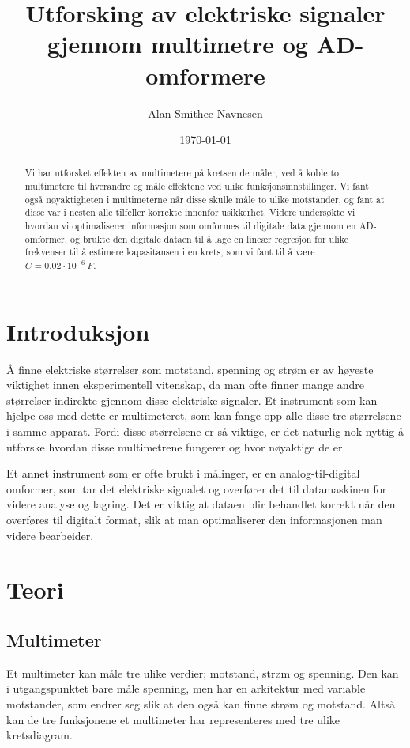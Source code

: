 \documentclass[norsk,a4paper,12pt]{article}
\title{Utforsking av elektriske signaler gjennom multimetre og AD-omformere}
\author{Alan Smithee Navnesen}
\date{\today}
\begin{document}
\maketitle

\begin{abstract}

Vi har utforsket effekten av multimetere på kretsen de måler, ved å koble to multimetere til hverandre og måle effektene ved ulike funksjonsinnstillinger. Vi fant også nøyaktigheten i multimeterne når disse skulle måle to ulike motstander, og fant at disse var i nesten alle tilfeller korrekte innenfor usikkerhet. Videre undersøkte vi hvordan vi optimaliserer informasjon som omformes til digitale data gjennom en AD-omformer, og brukte den digitale dataen til å lage en lineær regresjon for ulike frekvenser til å estimere kapasitansen i en krets, som vi fant til å være $C = 0.02 \cdot 10^{-6} \ F$.

\end{abstract}

\section{Introduksjon}
Å finne elektriske størrelser som motstand, spenning og strøm er av høyeste viktighet innen eksperimentell vitenskap, da man ofte finner mange andre størrelser indirekte gjennom disse elektriske signaler. Et instrument som kan hjelpe oss med dette er multimeteret, som kan fange opp alle disse tre størrelsene i samme apparat. Fordi disse størrelsene er så viktige, er det naturlig nok nyttig å utforske hvordan disse multimetrene fungerer og hvor nøyaktige de er. 

Et annet instrument som er ofte brukt i målinger, er en analog-til-digital omformer, som tar det elektriske signalet og overfører det til datamaskinen for videre analyse og lagring. Det er viktig at dataen blir behandlet korrekt når den overføres til digitalt format, slik at man optimaliserer den informasjonen man videre bearbeider.


\section{Teori}
\subsection{Multimeter}
Et multimeter kan måle tre ulike verdier; motstand, strøm og spenning. Den kan i utgangspunktet bare måle spenning, men har en arkitektur med variable motstander, som endrer seg slik at den også kan finne strøm og motstand. Altså kan de tre funksjonene et multimeter har representeres med tre ulike kretsdiagram.
\end{document}
